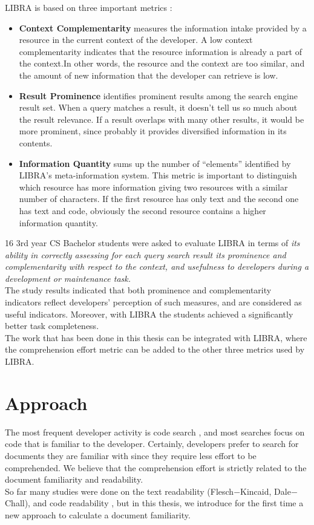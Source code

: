 \documentclass[12pt,mscthesis]{usiinfthesis}
\begin{document}
	LIBRA is based on three important metrics :
	
	\begin{itemize}
	\item \textbf{Context Complementarity} measures the information intake provided by a resource in the current context of the developer. A low context complementarity indicates that the resource information is already a part of the context.In other words, the resource and the context are too similar, and the amount of new information that the developer can retrieve is low.
	
	\item \textbf{Result Prominence} identifies prominent results among the search engine result set. When a query matches a result, it doesn't tell us so much about the result relevance. If a result overlaps with many other results, it would be more prominent, since probably it provides diversified information in its contents.
	
	\item \textbf{Information Quantity} sums up the number of ``elements'' identified by LIBRA's meta-information system. This metric is important to distinguish which resource has more information giving two resources with a similar number of characters. If the first resource has only text and the second one has text and code, obviously the second resource contains a higher information quantity.
	\end{itemize}

	16 3rd year CS Bachelor students were asked to evaluate LIBRA in terms of \textit{its ability in correctly assessing for each query search result its prominence and complementarity with respect to the context, and usefulness to developers during a development or maintenance task.}\\
	The study results indicated that both prominence and complementarity indicators reflect developers’ perception of such measures, and are considered as useful indicators. Moreover, with LIBRA the students  achieved a significantly better task completeness.\\

	The work that has been done in this thesis can be integrated with LIBRA, where the comprehension effort metric can be added to the other three metrics used by LIBRA.


\chapter{Approach}
 The most frequent developer activity is code search \cite{Singer-1997}, and most searches focus on code that is familiar to the developer\cite{Sadowski:2015}. Certainly, developers prefer to search for documents they are familiar with since they require less effort to be comprehended. We believe that the comprehension effort is strictly related to the document familiarity and readability.\\
 So far many studies were done on the text readability (Flesch$-$Kincaid, Dale$-$Chall), and code readability \cite{Buse:2010:LMC:1850489.1850615}, but in this thesis, we introduce for the first time a new approach to calculate a document familiarity.\\
\end{document}
